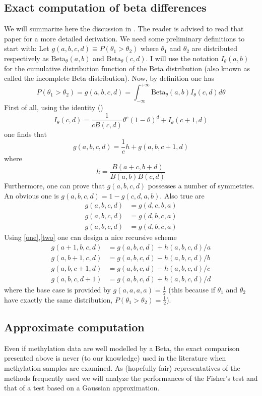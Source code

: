\documentclass[11pt]{amsart}
\newcommand{\betapdf}{\mbox{Beta}_\theta}
\begin{document}
\subsection{Exact computation of beta differences}
We will summarize here the discussion in \cite{numineq}. The reader is advised to read that paper for a more detailed derivation.
We need some preliminary definitions to start with:
Let  $g(a,b,c,d) \equiv P(\theta_1>\theta_2)$ where $\theta_1$ and $\theta_2$ are distributed respectively as $\betapdf(a,b)$ and $\betapdf(c,d)$. I will use the notation $I_\theta(a,b)$ for the cumulative distribution function of the Beta distribution (also known as called the incomplete Beta distribution). Now, by definition one has \[P(\theta_1>\theta_2)=g(a,b,c,d)=\int_{-\infty}^{+\infty} \betapdf(a,b)I_\theta(c,d) d\theta\]
First of all,  using the identity (\cite{abramowitz}) 
\[I_\theta(c,d)=\frac{1}{cB(c,d)}\theta^c(1-\theta)^d+I_\theta(c+1,d)\] one finds that 
\[g(a,b,c,d)=\frac{1}{c}h+g(a,b,c+1,d)\]\label{one} where \[h=\frac{B(a+c,b+d)}{B(a,b)B(c,d)}\]
Furthermore, one can prove that $g(a,b,c,d)$ possesses a number of symmetries.
An obvious one is $g(a,b,c,d)=1-g(c,d,a,b)$. Also true are 
\begin{align*}
g(a,b,c,d)&=g(d,c,b,a) \\
g(a,b,c,d)&=g(d,b,c,a) \\
g(a,b,c,d)&=g(d,b,c,a) 
\end{align*}\label{two}
Using \ref{one},\ref{two} one can design a nice recursive scheme
\begin{align*}
g(a+1,b,c,d) &= g(a,b,c,d) + h(a,b,c,d)/a \\
g(a,b+1,c,d) &= g(a,b,c,d) - h(a,b,c,d)/b \\
g(a,b,c+1,d) &= g(a,b,c,d) - h(a,b,c,d)/c \\
g(a,b,c,d+1) &= g(a,b,c,d) + h(a,b,c,d)/d 
\end{align*}
where the base case is provided by $g(a,a,a,a)=\frac{1}{2}$ (this because if $\theta_1$ and $\theta_2$ have exactly the same distribution, $P(\theta_1>\theta_2)=\frac{1}{2}$).
\subsection{Approximate computation}
Even if methylation data are well modelled by a Beta, the exact comparison presented above is never (to our knowledge) used in the literature when methylation samples are examined. As (hopefully fair) representatives of the methods frequently used we will analyze the performances of the Fisher's test and that of a test based on a Gaussian approximation.
\end{document}
